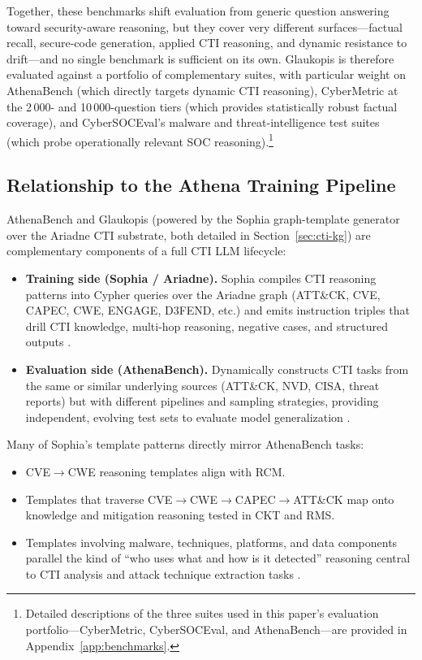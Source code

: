 \documentclass[webpdf,contemporary,large]{oup-authoring-template}
\theoremstyle{thmstyleone}
\theoremstyle{thmstyletwo}
\theoremstyle{thmstylethree}
\begin{document}
Together, these benchmarks shift evaluation from generic question answering toward security-aware reasoning, but they cover very different surfaces---factual recall, secure-code generation, applied CTI reasoning, and dynamic resistance to drift---and no single benchmark is sufficient on its own. Glaukopis is therefore evaluated against a portfolio of complementary suites, with particular weight on AthenaBench (which directly targets dynamic CTI reasoning), CyberMetric at the 2\,000- and 10\,000-question tiers (which provides statistically robust factual coverage), and CyberSOCEval's malware and threat-intelligence test suites (which probe operationally relevant SOC reasoning).\footnote{Detailed descriptions of the three suites used in this paper's evaluation portfolio---CyberMetric, CyberSOCEval, and AthenaBench---are provided in Appendix~\ref{app:benchmarks}.}

\subsection{Relationship to the Athena Training Pipeline}

AthenaBench and Glaukopis (powered by the Sophia graph-template generator over the Ariadne CTI substrate, both detailed in Section~\ref{sec:cti-kg}) are complementary components of a full CTI LLM lifecycle:

\begin{itemize}
  \item \textbf{Training side (Sophia / Ariadne).} Sophia compiles CTI reasoning patterns into Cypher queries over the Ariadne graph (ATT\&CK, CVE, CAPEC, CWE, ENGAGE, D3FEND, etc.) and emits instruction triples that drill CTI knowledge, multi-hop reasoning, negative cases, and structured outputs \cite{cardei2025ift}.
  \item \textbf{Evaluation side (AthenaBench).} Dynamically constructs CTI tasks from the same or similar underlying sources (ATT\&CK, NVD, CISA, threat reports) but with different pipelines and sampling strategies, providing independent, evolving test sets to evaluate model generalization \cite{alam2025athenabench}.
\end{itemize}

Many of Sophia's template patterns directly mirror AthenaBench tasks:
\begin{itemize}
  \item CVE$\rightarrow$CWE reasoning templates align with RCM.
  \item Templates that traverse CVE$\rightarrow$CWE$\rightarrow$CAPEC$\rightarrow$ATT\&CK map onto knowledge and mitigation reasoning tested in CKT and RMS.
  \item Templates involving malware, techniques, platforms, and data components parallel the kind of ``who uses what and how is it detected'' reasoning central to CTI analysis and attack technique extraction tasks \cite{cardei2025ift}.
\end{itemize}
\end{document}
